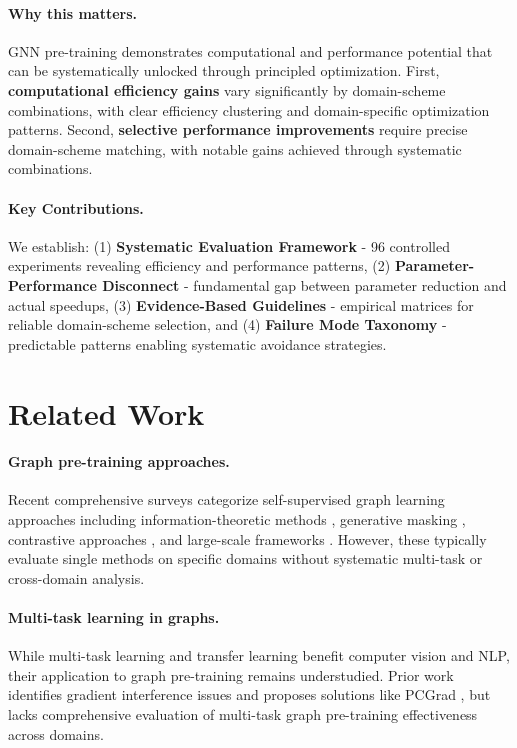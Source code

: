 \documentclass[11pt]{article}
\begin{document}
\paragraph{Why this matters.}
GNN pre-training demonstrates computational and performance potential that can be systematically unlocked through principled optimization.
First, \textbf{computational efficiency gains} vary significantly by domain-scheme combinations, with clear efficiency clustering and domain-specific optimization patterns.
Second, \textbf{selective performance improvements} require precise domain-scheme matching, with notable gains achieved through systematic combinations.
\paragraph{Key Contributions.}
We establish: (1) \textbf{Systematic Evaluation Framework} - 96 controlled experiments revealing efficiency and performance patterns, (2) \textbf{Parameter-Performance Disconnect} - fundamental gap between parameter reduction and actual speedups, (3) \textbf{Evidence-Based Guidelines} - empirical matrices for reliable domain-scheme selection, and (4) \textbf{Failure Mode Taxonomy} - predictable patterns enabling systematic avoidance strategies.

\section{Related Work}

\paragraph{Graph pre-training approaches.} Recent comprehensive surveys \citep{xie2022self,liu2022graph} categorize self-supervised graph learning approaches including information-theoretic methods \citep{velickovic2019dgi,sun2020infograph}, generative masking \citep{hu2019strategies}, contrastive approaches \citep{you2020graphcl,hou2022graphmae}, and large-scale frameworks \citep{qiu2020gcc,liu2022graphmvp}. However, these typically evaluate single methods on specific domains without systematic multi-task or cross-domain analysis.

\paragraph{Multi-task learning in graphs.} While multi-task learning \citep{caruana1997multitask} and transfer learning \citep{pan2010survey} benefit computer vision and NLP, their application to graph pre-training remains understudied. Prior work identifies gradient interference issues and proposes solutions like PCGrad \citep{yu2020pcgrad}, but lacks comprehensive evaluation of multi-task graph pre-training effectiveness across domains.
\end{document}
